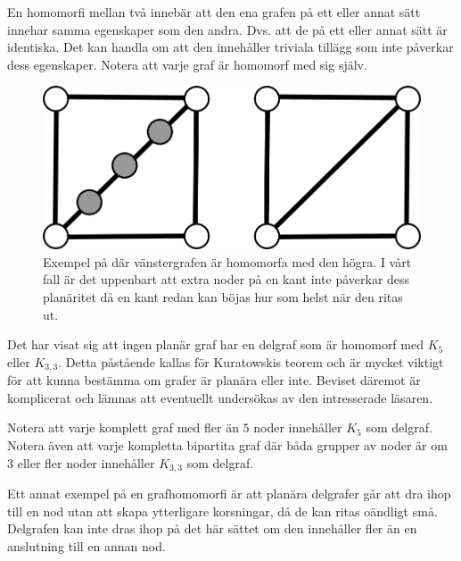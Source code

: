 \documentclass[a4paper,11pt]{article}
\begin{document}
En homomorfi mellan två innebär att den ena grafen på ett eller annat sätt innehar samma egenskaper som den andra. Dvs. att de på ett eller annat sätt är identiska. Det kan handla om att den innehåller triviala tillägg som inte påverkar dess egenskaper. Notera att varje graf är homomorf med sig själv.

\begin{figure}[!ht]
	\begin{center}
		\includegraphics{fig8}
		\caption{Exempel på där vänstergrafen är homomorfa med den högra. I vårt fall är det uppenbart att extra noder på en kant inte påverkar dess planäritet då en kant redan kan böjas hur som helst när den ritas ut.}
		\label{fig8}
	\end{center}
\end{figure}
\FloatBarrier

Det har visat sig att ingen planär graf har en delgraf som är homomorf med $K_{5}$ eller $K_{3,3}$.
Detta påstående kallas för Kuratowskis teorem och är mycket viktigt för att kunna bestämma om grafer är planära eller inte. 
Beviset däremot är komplicerat och lämnas att eventuellt undersökas av den intresserade läsaren.

Notera att varje komplett graf med fler än $5$ noder innehåller $K_5$ som delgraf. Notera även att varje kompletta bipartita graf där båda grupper av noder är om 3 eller fler noder innehåller $K_{3,3}$ som delgraf.

Ett annat exempel på en grafhomomorfi är att planära delgrafer går att dra ihop till en nod utan att skapa ytterligare korsningar, då de kan ritas oändligt små. Delgrafen kan inte dras ihop på det här sättet om den innehåller fler än en anslutning till en annan nod.
\end{document}

